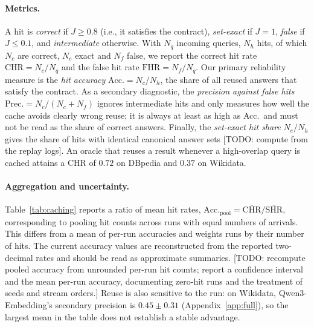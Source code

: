 \documentclass[runningheads]{llncs}
\newcommand{\hp}[1]{{\color{red!75!black}#1}}
\begin{document}
\paragraph{Metrics.}
A hit is \emph{correct} if $J \geq 0.8$ (i.e., it satisfies the contract),
\emph{set-exact} if $J = 1$, \emph{false} if $J \leq 0.1$, and
\emph{intermediate} otherwise. With $N_q$ incoming queries, $N_h$ hits, of
which $N_c$ are correct, $N_e$ exact and $N_f$ false, we report the correct hit
rate $\mathrm{CHR} = N_c/N_q$ and the false hit rate $\mathrm{FHR} = N_f/N_q$.
Our primary reliability measure is the \emph{hit accuracy}
$\mathrm{Acc.} = N_c/N_h$, the share of all reused answers that satisfy the
contract. As a secondary diagnostic, the \emph{precision against false hits}
$\mathrm{Prec.} = N_c/(N_c+N_f)$ ignores intermediate hits and only measures
how well the cache avoids clearly wrong reuse; it is always at least as high
as Acc.\ and must not be read as the share of correct answers. Finally, the \emph{set-exact hit share} $N_e/N_h$ gives
the share of hits with identical canonical answer sets
\hp{[TODO: compute from the replay logs]}. An oracle that reuses a result
whenever a high-overlap query is cached attains a CHR of $0.72$ on
DBpedia and $0.37$ on Wikidata.



\paragraph{Aggregation and uncertainty.}
Table~\ref{tab:caching} reports a ratio of mean hit rates,
$\mathrm{Acc.}_{\mathrm{pool}} = \overline{\mathrm{CHR}} /
\overline{\mathrm{SHR}}$, corresponding to pooling hit counts across runs
with equal numbers of arrivals. This differs from a mean of per-run
accuracies and weights runs by their number of hits. The current accuracy
values are reconstructed from the reported two-decimal rates and should be
read as approximate summaries.
\hp{[TODO: recompute pooled accuracy from unrounded per-run hit counts;
report a confidence interval and the mean per-run accuracy, documenting
zero-hit runs and the treatment of seeds and stream orders.]}
Reuse is also sensitive to the run: on Wikidata, Qwen3-Embedding's secondary
precision is $0.45 \pm 0.31$ (Appendix~\ref{app:full}), so the largest mean
in the table does not establish a stable advantage.
\end{document}

